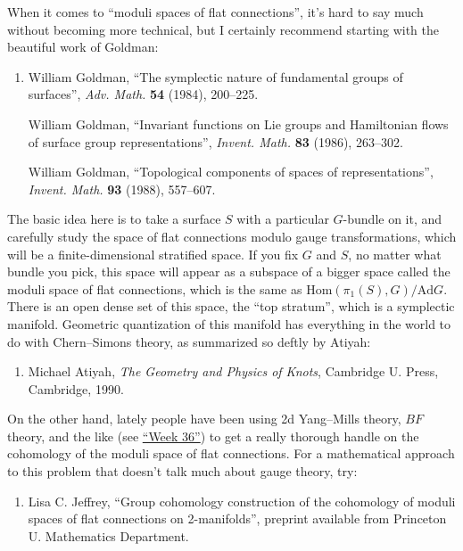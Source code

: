 \documentclass{article}
\def\tightlist{}
\begin{document}
When it comes to ``moduli spaces of flat connections'', it's hard to say
much without becoming more technical, but I certainly recommend starting
with the beautiful work of Goldman:

\begin{enumerate}
\def\labelenumi{\arabic{enumi})}
\setcounter{enumi}{3}
\item
  William Goldman, ``The symplectic nature of fundamental groups of surfaces'',  
  \emph{Adv. Math.} \textbf{54} (1984), 200--225.

   William Goldman, ``Invariant functions on Lie groups and Hamiltonian flows of surface
  group representations'', \emph{Invent. Math.}
  \textbf{83} (1986), 263--302.

  William Goldman, ``Topological components of spaces of representations'', 
  \emph{Invent. Math.} \textbf{93} (1988), 557--607.
\end{enumerate}
\noindent
The basic idea here is to take a surface \(S\) with a particular
\(G\)-bundle on it, and carefully study the space of flat connections
modulo gauge transformations, which will be a finite-dimensional
stratified space. If you fix \(G\) and \(S\), no matter what bundle you
pick, this space will appear as a subspace of a bigger space called the
moduli space of flat connections, which is the same as
\(\mathrm{Hom}(\pi_1(S),G)/\mathrm{Ad} G\). There is an open dense set
of this space, the ``top stratum'', which is a symplectic manifold.
Geometric quantization of this manifold has everything in the world to
do with Chern--Simons theory, as summarized so deftly by Atiyah:

\begin{enumerate}
\def\labelenumi{\arabic{enumi})}
\setcounter{enumi}{4}
\tightlist
\item
   Michael Atiyah, \emph{The Geometry and Physics of Knots}, Cambridge
  U. Press, Cambridge, 1990.
\end{enumerate}

On the other hand, lately people have been using 2d Yang--Mills theory,
\(BF\) theory, and the like (see \protect\hyperlink{week36}{``Week
36''}) to get a really thorough handle on the cohomology of the moduli
space of flat connections. For a mathematical approach to this problem
that doesn't talk much about gauge theory, try:

\begin{enumerate}
\def\labelenumi{\arabic{enumi})}
\setcounter{enumi}{5}
\tightlist
\item
   Lisa C. Jeffrey, ``Group cohomology construction of the cohomology of moduli spaces of
  flat connections on 2-manifolds'', preprint
  available from Princeton U. Mathematics Department.
\end{enumerate}
\end{document}
